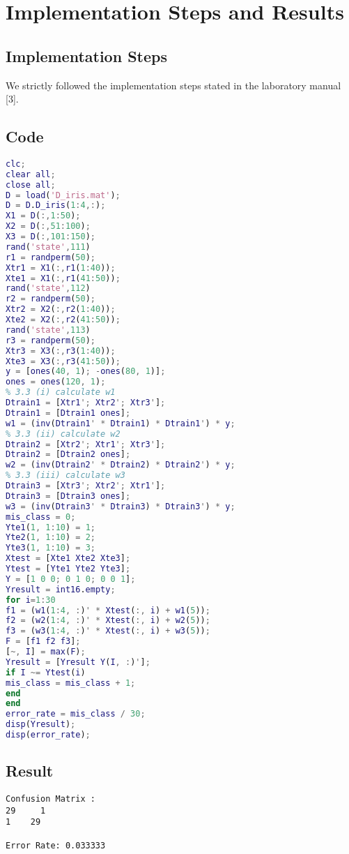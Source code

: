\section{Implementation Steps and Results}
\label{sect:implementation-result}

\subsection{Implementation Steps}
\label{subsect:implementation_steps}
We strictly followed the implementation steps stated in the laboratory manual [3].

\subsection{Code}
\label{subsect:code}

\begin{lstlisting}[language=Matlab]
clc;
clear all;
close all;
D = load('D_iris.mat');
D = D.D_iris(1:4,:);
X1 = D(:,1:50);
X2 = D(:,51:100);
X3 = D(:,101:150);
rand('state',111)
r1 = randperm(50);
Xtr1 = X1(:,r1(1:40));
Xte1 = X1(:,r1(41:50));
rand('state',112)
r2 = randperm(50);
Xtr2 = X2(:,r2(1:40));
Xte2 = X2(:,r2(41:50));
rand('state',113)
r3 = randperm(50);
Xtr3 = X3(:,r3(1:40));
Xte3 = X3(:,r3(41:50));
y = [ones(40, 1); -ones(80, 1)];
ones = ones(120, 1);
% 3.3 (i) calculate w1
Dtrain1 = [Xtr1'; Xtr2'; Xtr3'];
Dtrain1 = [Dtrain1 ones];
w1 = (inv(Dtrain1' * Dtrain1) * Dtrain1') * y;
% 3.3 (ii) calculate w2
Dtrain2 = [Xtr2'; Xtr1'; Xtr3'];
Dtrain2 = [Dtrain2 ones];
w2 = (inv(Dtrain2' * Dtrain2) * Dtrain2') * y;
% 3.3 (iii) calculate w3
Dtrain3 = [Xtr3'; Xtr2'; Xtr1'];
Dtrain3 = [Dtrain3 ones];
w3 = (inv(Dtrain3' * Dtrain3) * Dtrain3') * y;
mis_class = 0;
Yte1(1, 1:10) = 1;
Yte2(1, 1:10) = 2;
Yte3(1, 1:10) = 3;
Xtest = [Xte1 Xte2 Xte3];
Ytest = [Yte1 Yte2 Yte3];
Y = [1 0 0; 0 1 0; 0 0 1];
Yresult = int16.empty;
for i=1:30
f1 = (w1(1:4, :)' * Xtest(:, i) + w1(5));
f2 = (w2(1:4, :)' * Xtest(:, i) + w2(5));
f3 = (w3(1:4, :)' * Xtest(:, i) + w3(5));
F = [f1 f2 f3];
[~, I] = max(F);
Yresult = [Yresult Y(I, :)'];
if I ~= Ytest(i)
mis_class = mis_class + 1;
end
end
error_rate = mis_class / 30;
disp(Yresult);
disp(error_rate);
\end{lstlisting}

\subsection{Result}
\label{subsect:result}
\begin{verbatim}
Confusion Matrix : 
29     1
1    29

Error Rate: 0.033333
\end{verbatim}